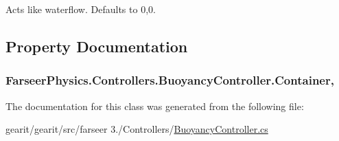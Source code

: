 Acts like waterflow. Defaults to 0,0. 



\subsection{Property Documentation}
\hypertarget{class_farseer_physics_1_1_controllers_1_1_buoyancy_controller_aab8b52db8eb3243c56ce5e2a0b525f58}{
\subsubsection[{Container}]{ Farseer\+Physics.\+Controllers.\+Buoyancy\+Controller.\+Container\hspace{0.3cm}{\ttfamily [get]}, {\ttfamily [set]}}}\label{class_farseer_physics_1_1_controllers_1_1_buoyancy_controller_aab8b52db8eb3243c56ce5e2a0b525f58}


The documentation for this class was generated from the following file\+:\begin{DoxyCompactItemize}
\item 
gearit/gearit/src/farseer 3./\+Controllers/\hyperlink{_buoyancy_controller_8cs}{Buoyancy\+Controller.\+cs}\end{DoxyCompactItemize}
